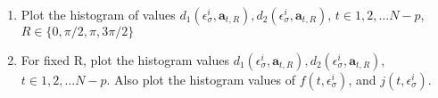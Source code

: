 \documentclass[11pt]{article}
\newcommand{\ba}{\boldsymbol{a}}
\begin{document}
\begin{enumerate}
\item Plot the histogram of values $d_{1}(\epsilon_{\sigma}^i, \ba_{t,R}), d_{2}(\epsilon_{\sigma}^i, \ba_{t,R})$, $t\in 1,2,\ldots N-p$, $R \in \{ 0,\pi/2, \pi, 3\pi/2 \}$ 
\item For fixed R, plot the histogram values $d_{1}(\epsilon_{\sigma}^i, \ba_{t,R}), d_{2}(\epsilon_{\sigma}^i, \ba_{t,R})$, $t\in 1,2,\ldots N-p$. Also plot the histogram values of $f(t,\epsilon_{\sigma}^i)$, and $j(t,\epsilon_{\sigma}^i)$.
\end{enumerate}
\end{document}
